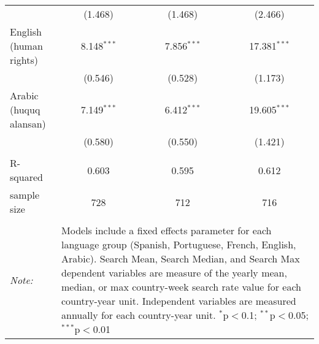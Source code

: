 \begin{table}[!htbp]
\begin{tabular}{@{\extracolsep{5pt}}lccc}
  & (1.468) & (1.468) & (2.466) \\ 
  English (human rights) & 8.148$^{***}$ & 7.856$^{***}$ & 17.381$^{***}$ \\ 
  & (0.546) & (0.528) & (1.173) \\ 
  Arabic (huquq alansan) & 7.149$^{***}$ & 6.412$^{***}$ & 19.605$^{***}$ \\ 
  & (0.580) & (0.550) & (1.421) \\ 
 \hline \\[-1.8ex] 
R-squared  & 0.603 & 0.595 & 0.612 \\ 
sample size  & 728 & 712 & 716 \\ 
\hline 
\hline \\[-1.8ex] 
\textit{Note:}  & \multicolumn{3}{l}{\parbox[t]{8cm}{Models include a fixed effects parameter for each language group (Spanish, Portuguese, French, English, Arabic). Search Mean, Search Median, and Search Max dependent variables are measure of the yearly mean, median, or max country-week search rate value for each country-year unit. Independent variables are measured annually for each country-year unit. $^{*}$p$<$0.1; $^{**}$p$<$0.05; $^{***}$p$<$0.01}} \\ 
\end{tabular} 
\end{table} 
